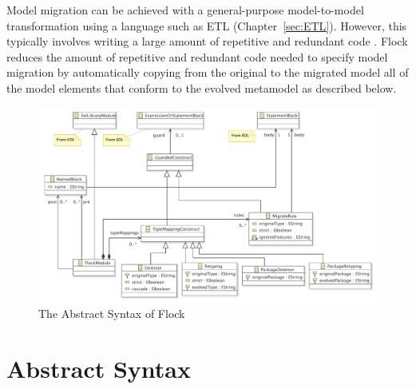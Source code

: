 Model migration can be achieved with a general-purpose model-to-model transformation using a language such as ETL (Chapter~\ref{sec:ETL}). However, this typically involves writing a large amount of repetitive and redundant code \cite{rose12flock}. Flock reduces the amount of repetitive and redundant code needed to specify model migration by automatically copying from the original to the migrated model all of the model elements that conform to the evolved metamodel as described below.




\begin{figure}
	\centering
		\includegraphics{images/FlockAbstractSyntax.pdf}
	\caption{The Abstract Syntax of Flock}
	\label{fig:flock_abstract_syntax}
\end{figure}


\section{Abstract Syntax}

